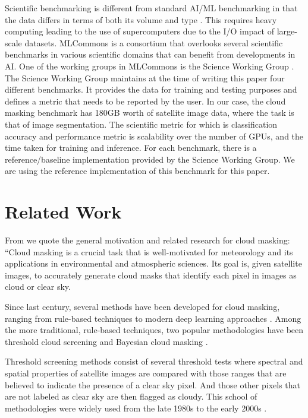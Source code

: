 \documentclass[sigplan,screen]{acmart}
\begin{document}
Scientific benchmarking is different from standard AI/ML benchmarking in that the data differs in terms of both its volume and type \cite{las-2023-mlcommons-edu-eq}. This requires heavy computing leading to the use of supercomputers  \cite{Farrell2021MLPerfHA} due to the I/O impact of large-scale datasets. MLCommons is a consortium that overlooks several scientific benchmarks in various scientific domains that can benefit from developments in AI. One of the working groups in MLCommons is the Science Working Group \cite{Thiyagalingam2022AIBF}. The Science Working Group maintains at the time of writing this paper four different benchmarks. It provides the data for training and testing purposes and defines a metric that needs to be reported by the user. In our case, the cloud masking benchmark has 180GB worth of satellite image data, where the task is that of image segmentation. The scientific metric for which is classification accuracy and performance metric is scalability over the number of GPUs, and the time taken for training and inference. 
For each benchmark, there is a reference/baseline implementation provided by the Science Working Group. We are using the reference implementation of this benchmark for this paper.

\section{Related Work}

From \cite{las-2023-cloudmask-related} we quote the general motivation and related research for cloud masking: ``Cloud masking is a crucial task that is well-motivated for meteorology and its applications in environmental and atmospheric sciences. Its goal is, given satellite images, to accurately generate cloud masks that identify each pixel in images as cloud or clear sky.

Since last century, several methods have been developed for cloud masking, ranging from rule-based techniques \cite{Saunders1986AnAS,Saunders1988AnIM,Merchant2005ProbabilisticPB, Zhu2012ObjectbasedCA} to modern deep learning approaches \cite{Li2019DeepLB,Domnich2021KappaMaskAC,Yan2018CloudAC,WIELAND2019111203,JEPPESEN2019247}. Among the more traditional, rule-based techniques, two popular methodologies have been threshold cloud screening \cite{Saunders1986AnAS,Saunders1988AnIM} and Bayesian cloud masking \cite{Merchant2005ProbabilisticPB}. 

Threshold screening methods consist of several threshold tests where spectral and spatial properties of satellite images are compared with those ranges that are believed to indicate the presence of a clear sky pixel. And those other pixels that are not labeled as clear sky are then flagged as cloudy. This school of methodologies were widely used from the late 1980s to the early 2000s \cite{Merchant2005ProbabilisticPB}. 
\end{document}
